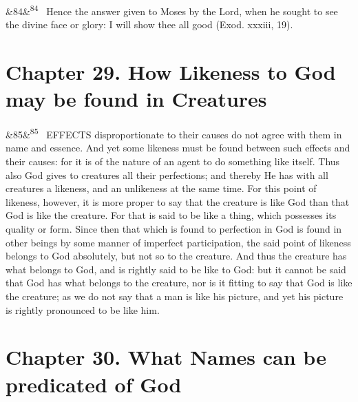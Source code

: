 \documentclass[12pt]{article}
\newcommand{\para}[1][]{\par\noindent\ifx&#1&\else\textsuperscript{\footnotesize #1}~\fi}
\begin{document}
\para[84] Hence the answer given to Moses by the Lord, when he sought to see the divine face or glory: I will show thee all good (Exod. xxxiii, 19).

\section*{Chapter 29. How Likeness to God may be found in Creatures}

\para[85] EFFECTS disproportionate to their causes do not agree with them in name and essence. And yet some likeness must be found between such effects and their causes: for it is of the nature of an agent to do something like itself. Thus also God gives to creatures all their perfections; and thereby He has with all creatures a likeness, and an unlikeness at the same time. For this point of likeness, however, it is more proper to say that the creature is like God than that God is like the creature. For that is said to be like a thing, which possesses its quality or form. Since then that which is found to perfection in God is found in other beings by some manner of imperfect participation, the said point of likeness belongs to God absolutely, but not so to the creature. And thus the creature has what belongs to God, and is rightly said to be like to God: but it cannot be said that God has what belongs to the creature, nor is it fitting to say that God is like the creature; as we do not say that a man is like his picture, and yet his picture is rightly pronounced to be like him.

\section*{Chapter 30. What Names can be predicated of God}
\end{document}
